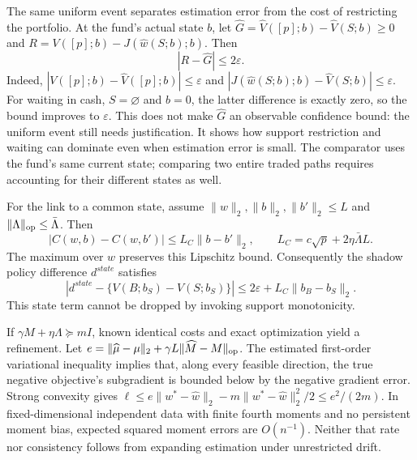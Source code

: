 \documentclass[11pt,a4paper]{article}
\theoremstyle{remark}\newtheorem{remark}[theorem]{Remark}
\newcommand{\norm}[1]{\lVert#1\rVert}\newcommand{\pos}[1]{[#1]_+}
\begin{document}
The same uniform event separates estimation error from the cost of restricting
the portfolio. At the fund's actual state $b$, let
$\widehat G=\widehat V([p];b)-\widehat V(S;b)\ge0$ and
$R=V([p];b)-J(\widehat w(S;b);b)$. Then
\begin{equation}
 |R-\widehat G|\le2\varepsilon.
\end{equation}
Indeed, $|V([p];b)-\widehat V([p];b)|\le\varepsilon$ and
$|J(\widehat w(S;b);b)-\widehat V(S;b)|\le\varepsilon$.
For waiting in cash, $S=\varnothing$ and $b=0$, the latter difference is exactly
zero, so the bound improves to $\varepsilon$. This does not make
$\widehat G$ an observable confidence bound: the uniform event still needs
justification. It shows how support restriction and waiting can dominate even
when estimation error is small. The comparator uses the fund's same current
state; comparing two entire traded paths requires accounting for their
different states as well.

For the link to a common state, assume $\norm w_2,\norm b_2,\norm{b'}_2\le L$
and $\norm\Lambda_{\op}\le\bar\Lambda$. Then
\begin{equation}
 |C(w,b)-C(w,b')|\le L_C\norm{b-b'}_2,\qquad
 L_C=c\sqrt p+2\eta\bar\Lambda L.
\end{equation}
The maximum over $w$ preserves this Lipschitz bound. Consequently the shadow
policy difference $d^{state}$ satisfies
\begin{equation}
 |d^{state}-\{V(B;b_S)-V(S;b_S)\}|
 \le2\varepsilon+L_C\norm{b_B-b_S}_2.\label{eq:bridge}
\end{equation}
This state term cannot be dropped by invoking support monotonicity.

If $\gamma M+\eta\Lambda\succeq mI$, known identical costs and exact
optimization yield a refinement. Let
$e=\norm{\widehat\mu-\mu}_2+\gamma L\norm{\widehat M-M}_{\op}$.
The estimated first-order variational inequality implies that, along every
feasible direction, the true negative objective's subgradient is bounded
below by the negative gradient error. Strong convexity gives
$\ell\le e\norm{w^*-\widehat w}_2-m\norm{w^*-\widehat w}_2^2/2
\le e^2/(2m)$.
In fixed-dimensional independent data with finite fourth moments and no
persistent moment bias, expected squared moment errors are $O(n^{-1})$.
Neither that rate nor consistency follows from expanding estimation under
unrestricted drift.


\end{document}
